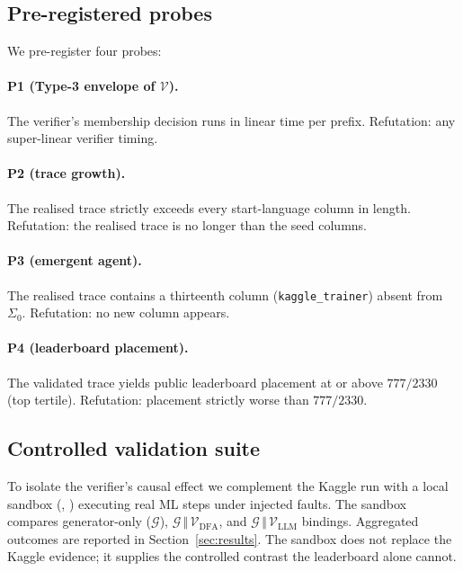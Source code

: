 \subsection{Pre-registered probes}

We pre-register four probes:

\paragraph{P1 (Type-3 envelope of $\mathcal{V}$).}
The verifier's membership decision runs in linear time per prefix.
Refutation: any super-linear verifier timing.

\paragraph{P2 (trace growth).}
The realised trace strictly exceeds every start-language column in
length.  Refutation: the realised trace is no longer than the seed
columns.

\paragraph{P3 (emergent agent).}
The realised trace contains a thirteenth column
(\texttt{kaggle\_trainer}) absent from $\Sigma_0$.
Refutation: no new column appears.

\paragraph{P4 (leaderboard placement).}
The validated trace yields public leaderboard placement at or above
$777/2330$ (top tertile).  Refutation: placement strictly worse than
$777/2330$.

\subsection{Controlled validation suite}

To isolate the verifier's causal effect we complement the Kaggle run
with a local sandbox (,
) executing real ML steps under injected
faults.  The sandbox compares generator-only
($\mathcal{G}$), $\mathcal{G}\,\Vert\,\mathcal{V}_{\mathrm{DFA}}$,
and $\mathcal{G}\,\Vert\,\mathcal{V}_{\mathrm{LLM}}$ bindings.
Aggregated outcomes are reported in
Section~\ref{sec:results}.  The sandbox does not replace the Kaggle
evidence; it supplies the controlled contrast the leaderboard alone
cannot.
